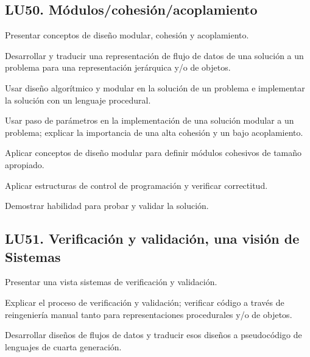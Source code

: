 \subsection{LU50. Módulos/cohesión/acoplamiento}\label{sec:BOK-LU50}\label{sec:LU50}
\begin{LearningUnit}
\begin{LUGoal}
\item Presentar conceptos de diseño modular, cohesión y acoplamiento.
\end{LUGoal}

\begin{LUObjective}
\item Desarrollar y traducir una representación de flujo de datos de una solución a un problema para una representación jerárquica y/o de objetos.
\item Usar diseño algorítmico y modular en la solución de un problema e implementar la solución con un lenguaje procedural.
\item Usar paso de parámetros en la implementación de una solución modular a un problema; explicar la importancia de una alta cohesión y un bajo acoplamiento.
\item Aplicar conceptos de diseño modular para definir módulos cohesivos de tamaño apropiado.
\item Aplicar estructuras de control de programación y verificar correctitud.
\item Demostrar habilidad para probar y validar la solución.
\end{LUObjective}
\end{LearningUnit}

\subsection{LU51. Verificación y validación, una visión de Sistemas}\label{sec:BOK-LU51}\label{sec:LU51}
\begin{LearningUnit}
\begin{LUGoal}
\item Presentar una vista sistemas de verificación y validación.
\end{LUGoal}

\begin{LUObjective}
\item Explicar el proceso de verificación y validación; verificar código a través de reingeniería manual tanto para representaciones procedurales y/o de objetos.
\item Desarrollar diseños de flujos de datos y traducir esos diseños a pseudocódigo de lenguajes de cuarta generación.
\end{LUObjective}
\end{LearningUnit}

